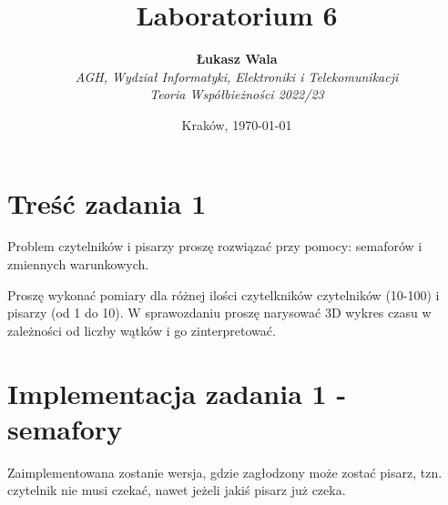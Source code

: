 \documentclass{article}
\title{Laboratorium 6}
\author{\textbf{Łukasz Wala}\\
    \textit{AGH, Wydział Informatyki, Elektroniki i Telekomunikacji} \\
    \textit{Teoria Współbieżności 2022/23}}
\date{Kraków, \today}
\begin{document}
\maketitle

\section{Treść zadania 1}
Problem czytelników i pisarzy proszę rozwiązać przy pomocy: semaforów i zmiennych warunkowych.

Proszę wykonać pomiary dla różnej ilości czytelkników czytelników (10-100) i pisarzy (od 1 do 10).
W sprawozdaniu proszę narysować 3D wykres czasu w zależności od liczby wątków i go zinterpretować.

\section{Implementacja zadania 1 - semafory}

Zaimplementowana zostanie wersja, gdzie zagłodzony może zostać pisarz, tzn. czytelnik nie musi czekać, 
nawet jeżeli jakiś pisarz już czeka.
\end{document}
